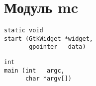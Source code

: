 \section{Модуль mc}

\begin{verbatim}
static void
start (GtkWidget *widget,
       gpointer   data)
\end{verbatim}

\begin{verbatim}
int
main (int   argc,
      char *argv[])
\end{verbatim}

